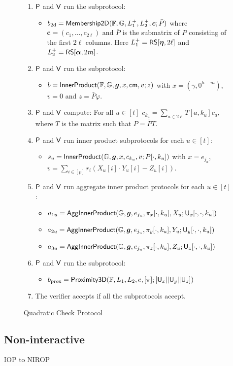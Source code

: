 \begin{figure}[h!]
\begin{framed}
\begin{itemize}
\begin{enumerate}[{\rm 1.}]
\item $\mathsf{P}$ and $\mathsf{V}$ run the subprotocol:
	\begin{itemize}
	\item $b_{\rm
2d}=\mathsf{Membership2D}(\mathbb{F},\mathbb{G},L^{+}_1,L^{+}_2,\bm{c};\bar{P})$ where
$\bm{c}=(c_1,\ldots,c_{2\ell})$ and $\bar{P}$ is the submatrix of $P$ consisting
of the first $2\ell$ columns. Here $L^{+}_1=\mathsf{RS}[\bm{\eta},2\ell]$ and
$L^{+}_2=\mathsf{RS}[\bm{\alpha},2m]$.
	\end{itemize}
\item $\mathsf{P}$ and $\mathsf{V}$ run the subprotocol:
	\begin{itemize}
	\item $b=\mathsf{InnerProduct}(\mathbb{F},\mathbb{G},\bm{g},x,\mathsf{cm},v;z)$
with $x=(\gamma,0^{h-m})$, $v=0$ and $z=\bar{P}\varphi$.
	\end{itemize}
\item $\mathsf{P}$ and $\mathsf{V}$ compute: For all $u\in [t]$ $c_{k_u} =
\sum_{a\in 2\ell}T[a,k_u]c_a$, where $T$ is the matrix such that $P=\bar{P}T$.
\item $\mathsf{P}$ and $\mathsf{V}$ run inner product subprotocols for each $u\in
[t]$:
	\begin{itemize}
	\item $s_u=\mathsf{InnerProduct}(\mathbb{G},\bm{g},x,c_{k_u},v;P[\cdot,k_u])$ with
$x=e_{j_u}$, $v=\sum_{i\in [p]}r_i(X_u[i]\cdot Y_u[i] - Z_u[i])$.
	\end{itemize}
\item $\mathsf{P}$ and $\mathsf{V}$ run aggregate inner product protocols for each
$u\in [t]$:
	\begin{itemize}
	\item
$a_{1u}=\mathsf{AggInnerProduct}(\mathbb{G},\bm{g},e_{j_u},\pi_x[\cdot,k_u],X_u;\mathsf{U}_x[\cdot,\cdot,k_u])$
	\item
$a_{2u}=\mathsf{AggInnerProduct}(\mathbb{G},\bm{g},e_{j_u},\pi_y[\cdot,k_u],Y_u;\mathsf{U}_y[\cdot,\cdot,k_u])$
	\item
$a_{3u}=\mathsf{AggInnerProduct}(\mathbb{G},\bm{g},e_{j_u},\pi_z[\cdot,k_u],Z_u;\mathsf{U}_z[\cdot,\cdot,k_u])$
	\end{itemize}
\item $\mathsf{P}$ and $\mathsf{V}$ run the subprotocol: 
	\begin{itemize}
	\item $b_{\rm prox} =
\mathsf{Proximity3D}(\mathbb{F},L_1,L_2,e,[\pi];[\mathsf{U}_x||\mathsf{U}_y||\mathsf{U}_z])$
	\end{itemize}
\item The verifier accepts if all the subprotocols accept.
\end{enumerate}
\end{itemize}
\end{framed}
\caption{Quadratic Check Protocol}
\label{fig:quadcheck}
\end{figure}



   



\subsection{Non-interactive}
IOP to NIROP
